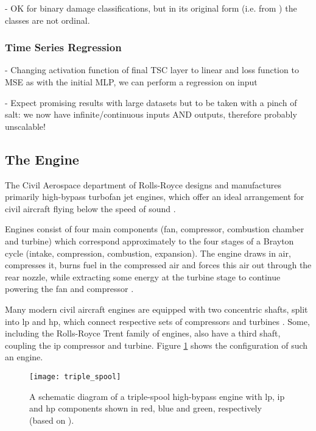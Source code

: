 - OK for binary damage classifications, but in its original form (i.e. from \cite[]{fawaz_inceptiontime_2019}) the classes are not ordinal.

\subsubsection{Time Series Regression}
- Changing activation function of final TSC layer to linear and loss function to MSE as with the initial MLP, we can perform a regression on input

- Expect promising results with large datasets but to be taken with a pinch of salt: we now have infinite/continuous inputs AND outputs, therefore probably unscalable!

\subsection{The Engine}
The Civil Aerospace department of Rolls-Royce designs and manufactures primarily high-bypass turbofan jet engines, which offer an ideal arrangement for civil aircraft flying below the speed of sound \cite[]{rolls-royce_plc_jet_2015}.

Engines consist of four main components (fan, compressor, combustion chamber and turbine) which correspond approximately to the four stages of a Brayton cycle (intake, compression, combustion, expansion). The engine draws in air, compresses it, burns fuel in the compressed air and forces this air out through the rear nozzle, while extracting some energy at the turbine stage to continue powering the fan and compressor \cite[]{rolls-royce_plc_jet_2015}.

Many modern civil aircraft engines are equipped with two concentric shafts, split into \ac{lp} and \ac{hp}, which connect respective sets of compressors and turbines \cite[]{spittle_gas_2003}. Some, including the Rolls-Royce Trent family of engines, also have a third shaft, coupling the \ac{ip} compressor and turbine. Figure \ref{fig:triple_spool} shows the configuration of such an engine.

\begin{figure}
    \centering
    \texttt{[image: triple\_spool]}
    \caption{\label{fig:triple_spool} A schematic diagram of a triple-spool high-bypass engine with \ac{lp}, \ac{ip} and \ac{hp} components shown in red, blue and green, respectively (based on \protect\cite[]{rolls-royce_plc_jet_2015}).}
\end{figure}

